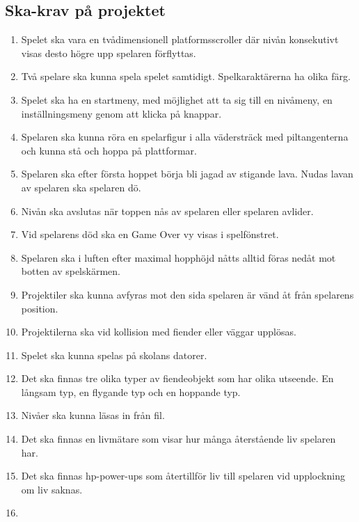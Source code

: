 \documentclass{TDP005mall}
\begin{document}
\subsection{Ska-krav på projektet}
\begin{enumerate}
\item Spelet ska vara en tvådimensionell platformsscroller där nivån konsekutivt visas desto högre upp spelaren förflyttas.
\item Två spelare ska kunna spela spelet samtidigt. Spelkaraktärerna ha olika färg.
\item Spelet ska ha en startmeny, med möjlighet att ta sig till en nivåmeny, en inställningsmeny genom att klicka på knappar.
\item Spelaren ska kunna röra en spelarfigur i alla vädersträck med piltangenterna och kunna stå och hoppa på plattformar.
\item Spelaren ska efter första hoppet börja bli jagad av stigande lava. Nudas lavan av spelaren ska spelaren dö.
\item Nivån ska avslutas när toppen nås av spelaren eller spelaren avlider.
\item Vid spelarens död ska en Game Over vy visas i spelfönstret.
\item Spelaren ska i luften efter maximal hopphöjd nåtts alltid föras nedåt mot botten av spelskärmen.
\item Projektiler ska kunna avfyras mot den sida spelaren är vänd åt från spelarens position.
\item Projektilerna ska vid kollision med fiender eller väggar upplösas.
\item Spelet ska kunna spelas på skolans datorer.
\item Det ska finnas tre olika typer av fiendeobjekt som har olika utseende. En långsam typ, en flygande typ och en hoppande typ.
\item Nivåer ska kunna läsas in från fil.
\item Det ska finnas en livmätare som visar hur många återstående liv spelaren har.
\item Det ska finnas hp-power-ups som återtillför liv till spelaren vid upplockning om liv saknas.
\item  

\end{enumerate}
\end{document}
